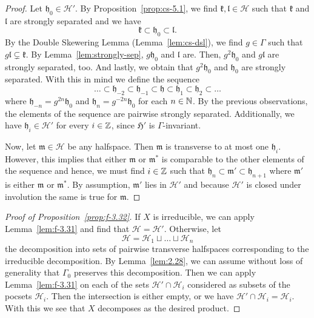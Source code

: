 \begin{proof}
  Let \(\mathfrak{h}_0 \in \mathcal{H}'\). By Proposition~\ref{prop:cs-5.1}, we find \(\mathfrak{k}, \mathfrak{l} \in \mathcal{H}\) such that \(\mathfrak{k}\) and \(\mathfrak{l}\) are strongly separated and we have
  \[
    \mathfrak{k} \subset \mathfrak{h}_0 \subset \mathfrak{l}.
  \]
  By the Double Skewering Lemma (Lemma~\ref{lem:cs-dsl}), we find \(g \in \Gamma\) such that \(g\mathfrak{l} \subsetneq \mathfrak{k}\). By Lemma~\ref{lem:strongly-sep}, \(g\mathfrak{h}_0\) and \(\mathfrak{l}\) are. Then, \(g^2\mathfrak{h}_0\) and \(g\mathfrak{l}\) are strongly separated, too. And lastly, we obtain that \(g^2\mathfrak{h}_0\) and \(\mathfrak{h}_0\) are strongly separated. With this in mind we define the sequence
  \[
    \dots \subset \mathfrak{h}_{-2} \subset \mathfrak{h}_{-1} \subset \mathfrak{h} \subset \mathfrak{h}_1 \subset \mathfrak{h}_2 \subset \dots
  \]
  where \(\mathfrak{h}_{-n} = g^{2n}\mathfrak{h}_0\) and \(\mathfrak{h}_n = g^{-2n}\mathfrak{h}_0\) for each \(n \in \mathbb{N}\). By the previous observations, the elements of the sequence are pairwise strongly separated. Additionally, we have \(\mathfrak{h}_i \in \mathcal{H}'\) for every \(i \in \mathbb{Z}\), since \(\mathfrak{H}'\) is \(\Gamma\)-invariant.

  Now, let \(\mathfrak{m} \in \mathcal{H}\) be any halfspace. Then \(\mathfrak{m}\) is transverse to at most one \(\mathfrak{h}_i\). However, this implies that either \(\mathfrak{m}\) or \(\mathfrak{m}^\ast\) is comparable to the other elements of the sequence and hence, we must find \(i \in \mathbb{Z}\) such that \(\mathfrak{h}_n \subset \mathfrak{m}' \subset \mathfrak{h}_{n+1}\) where \(\mathfrak{m}'\) is either \(\mathfrak{m}\) or \(\mathfrak{m}^\ast\). By assumption, \(\mathfrak{m}'\) lies in \(\mathcal{H}'\) and because \(\mathcal{H}'\) is closed under involution the same is true for \(\mathfrak{m}\).
\end{proof}

\begin{proof}[Proof of Proposition~\ref{prop:f-3.32}]
  If \(X\) is irreducible, we can apply Lemma~\ref{lem:f-3.31} and find that \(\mathcal{H} = \mathcal{H}'\). Otherwise, let
  \[
    \mathcal{H} = \mathcal{H}_1 \sqcup \dots \sqcup \mathcal{H}_n
  \]
  the decomposition into sets of pairwise transverse halfspaces corresponding to the irreducible decomposition. By Lemma~\ref{lem:2.28}, we can assume without loss of generality that \(\Gamma_0\) preserves this decomposition. Then we can apply Lemma~\ref{lem:f-3.31} on each of the sets \(\mathcal{H}' \cap \mathcal{H}_i\) considered as subsets of the pocsets \(\mathcal{H}_i\). Then the intersection is either empty, or we have \(\mathcal{H}' \cap \mathcal{H}_i = \mathcal{H}_i\). With this we see that \(X\) decomposes as the desired product.
\end{proof}

